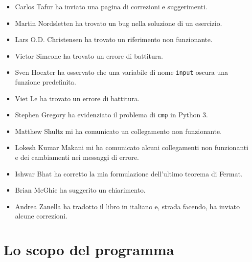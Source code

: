 \documentclass[10pt]{book}
\begin{document}
\begin{itemize}
\item Carlos Tafur ha inviato una pagina di correzioni e suggerimenti.

\item Martin Nordsletten ha trovato un bug nella soluzione di un esercizio.

\item Lars O.D. Christensen ha trovato un riferimento non funzionante.

\item Victor Simeone ha trovato un errore di battitura.

\item Sven Hoexter ha osservato che una variabile di nome {\tt input}
oscura una funzione predefinita.

\item Viet Le ha trovato un errore di battitura.

\item Stephen Gregory ha evidenziato il problema di {\tt cmp} in Python 3.

\item Matthew Shultz mi ha comunicato un collegamento non funzionante.

\item Lokesh Kumar Makani mi ha comunicato alcuni collegamenti non funzionanti e dei cambiamenti nei messaggi di errore.

\item Ishwar Bhat ha corretto la mia formulazione dell'ultimo teorema di Fermat.

\item Brian McGhie ha suggerito un chiarimento.

\item Andrea Zanella ha tradotto il libro in italiano e, strada facendo, ha inviato alcune correzioni.


\end{itemize}

\normalsize
\clearemptydoublepage

\begin{latexonly}

\tableofcontents

\clearemptydoublepage

\end{latexonly}

\mainmatter

\chapter{Lo scopo del programma}
\end{document}
